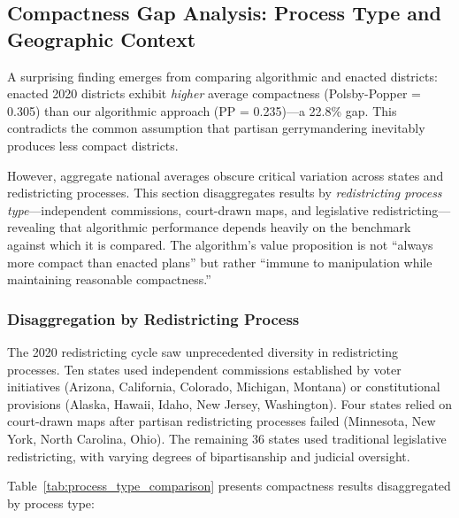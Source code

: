 \subsection{Compactness Gap Analysis: Process Type and Geographic Context}
\label{sec:compactness-gap-analysis}

A surprising finding emerges from comparing algorithmic and enacted districts: enacted 2020 districts exhibit \textit{higher} average compactness (Polsby-Popper = 0.305) than our algorithmic approach (PP = 0.235)—a 22.8\% gap. This contradicts the common assumption that partisan gerrymandering inevitably produces less compact districts.

However, aggregate national averages obscure critical variation across states and redistricting processes. This section disaggregates results by \textit{redistricting process type}—independent commissions, court-drawn maps, and legislative redistricting—revealing that algorithmic performance depends heavily on the benchmark against which it is compared. The algorithm's value proposition is not ``always more compact than enacted plans'' but rather ``immune to manipulation while maintaining reasonable compactness.''

\subsubsection{Disaggregation by Redistricting Process}

The 2020 redistricting cycle saw unprecedented diversity in redistricting processes. Ten states used independent commissions established by voter initiatives (Arizona, California, Colorado, Michigan, Montana) or constitutional provisions (Alaska, Hawaii, Idaho, New Jersey, Washington). Four states relied on court-drawn maps after partisan redistricting processes failed (Minnesota, New York, North Carolina, Ohio). The remaining 36 states used traditional legislative redistricting, with varying degrees of bipartisanship and judicial oversight.

Table~\ref{tab:process_type_comparison} presents compactness results disaggregated by process type:


